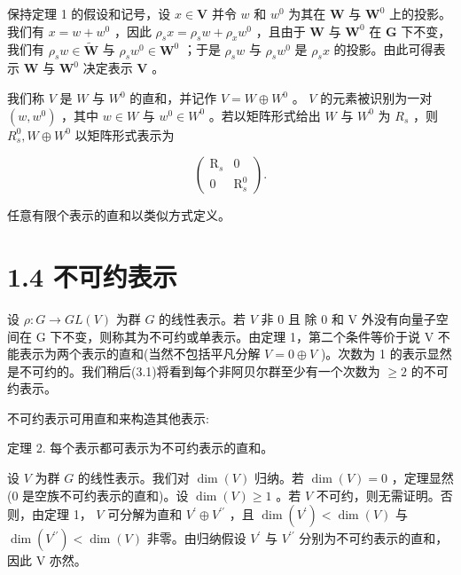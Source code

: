 \documentclass[10pt]{article}
\begin{document}
保持定理 1 的假设和记号，设 \(x \in  \mathbf{V}\) 并令 \(w\) 和 \({w}^{0}\) 为其在 \(\mathbf{W}\) 与 \({\mathbf{W}}^{0}\) 上的投影。我们有 \(x = w + {w}^{0}\) ，因此 \({\rho }_{s}x = {\rho }_{s}w + {\rho }_{x}{w}^{0}\) ，且由于 \(\mathbf{W}\) 与 \({\mathbf{W}}^{0}\) 在 \(\mathbf{G}\) 下不变，我们有 \({\rho }_{s}w \in  \widetilde{\mathbf{W}}\) 与 \({\rho }_{s}{w}^{0} \in  {\mathbf{W}}^{0}\) ；于是 \({\rho }_{s}w\) 与 \({\rho }_{s}{w}^{0}\) 是 \({\rho }_{s}x\) 的投影。由此可得表示 \(\mathbf{W}\) 与 \({\mathbf{W}}^{0}\) 决定表示 \(\mathbf{V}\) 。

我们称 \(V\) 是 \(W\) 与 \({W}^{0}\) 的直和，并记作 \(V = W \oplus  {W}^{0}\) 。 \(V\) 的元素被识别为一对 \(\left( {w,{w}^{0}}\right)\) ，其中 \(w \in  W\) 与 \({w}^{0} \in  {W}^{0}\) 。若以矩阵形式给出 \(W\) 与 \({W}^{0}\) 为 \({R}_{s}\) ，则 \({R}_{s}^{0},W \oplus  {W}^{0}\) 以矩阵形式表示为

\[
\left( \begin{matrix} {\mathrm{R}}_{s} & 0 \\  0 & {\mathrm{R}}_{s}^{0} \end{matrix}\right) .
\]

任意有限个表示的直和以类似方式定义。

\section*{1.4 不可约表示}

设 \(\rho  : G \rightarrow  {GL}\left( V\right)\) 为群 \(G\) 的线性表示。若 \(V\) 非 0 且 除 0 和 V 外没有向量子空间在 G 下不变，则称其为不可约或单表示。由定理 1，第二个条件等价于说 V 不能表示为两个表示的直和(当然不包括平凡分解 \(V = 0 \oplus  V\) )。次数为 1 的表示显然是不可约的。我们稍后(3.1)将看到每个非阿贝尔群至少有一个次数为 \(\geq  2\) 的不可约表示。

不可约表示可用直和来构造其他表示:

定理 2. 每个表示都可表示为不可约表示的直和。

设 \(V\) 为群 \(G\) 的线性表示。我们对 \(\dim \left( V\right)\) 归纳。若 \(\dim \left( V\right)  = 0\) ，定理显然(0 是空族不可约表示的直和)。设 \(\dim \left( V\right)  \geq  1\) 。若 \(V\) 不可约，则无需证明。否则，由定理 1， \(V\) 可分解为直和 \({V}^{\prime } \oplus  {V}^{\prime \prime }\) ，且 \(\dim \left( {V}^{\prime }\right)  < \dim \left( V\right)\) 与 \(\dim \left( {V}^{\prime \prime }\right)  < \dim \left( V\right)\) 非零。由归纳假设 \({V}^{\prime }\) 与 \({V}^{\prime \prime }\) 分别为不可约表示的直和，因此 V 亦然。
\end{document}
